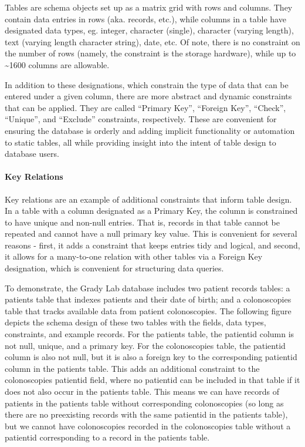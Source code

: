 \documentclass[]{article}
\let\oldparagraph\paragraph
\renewcommand{\paragraph}[1]{\oldparagraph{#1}\mbox{}}
\begin{document}
Tables are schema objects set up as a matrix grid with rows and columns.
They contain data entries in rows (aka. records, etc.), while columns in
a table have designated data types, eg. integer, character (single),
character (varying length), text (varying length character string),
date, etc. Of note, there is no constraint on the number of rows
(namely, the constraint is the storage hardware), while up to
\textasciitilde{}1600 columns are allowable.

In addition to these designations, which constrain the type of data that
can be entered under a given column, there are more abstract and dynamic
constraints that can be applied. They are called ``Primary Key'',
``Foreign Key'', ``Check'', ``Unique'', and ``Exclude'' constraints,
respectively. These are convenient for ensuring the database is orderly
and adding implicit functionality or automation to static tables, all
while providing insight into the intent of table design to database
users.

\paragraph{Key Relations}\label{key-relations}

Key relations are an example of additional constraints that inform table
design. In a table with a column designated as a Primary Key, the column
is constrained to have unique and non-null entries. That is, records in
that table cannot be repeated and cannot have a null primary key value.
This is convenient for several reasons - first, it adds a constraint
that keeps entries tidy and logical, and second, it allows for a
many-to-one relation with other tables via a Foreign Key designation,
which is convenient for structuring data queries.

To demonstrate, the Grady Lab database includes two patient records
tables: a patients table that indexes patients and their date of birth;
and a colonoscopies table that tracks available data from patient
colonoscopies. The following figure depicts the schema design of these
two tables with the fields, data types, constraints, and example
records. For the patients table, the patientid column is not null,
unique, and a primary key. For the colonoscopies table, the patientid
column is also not null, but it is also a foreign key to the
corresponding patientid column in the patients table. This adds an
additional constraint to the colonoscopies patientid field, where no
patientid can be included in that table if it does not also occur in the
patients table. This means we can have records of patients in the
patients table without corresponding colonoscopies (so long as there are
no preexisting records with the same patientid in the patients table),
but we cannot have colonoscopies recorded in the colonoscopies table
without a patientid corresponding to a record in the patients table.
\end{document}
